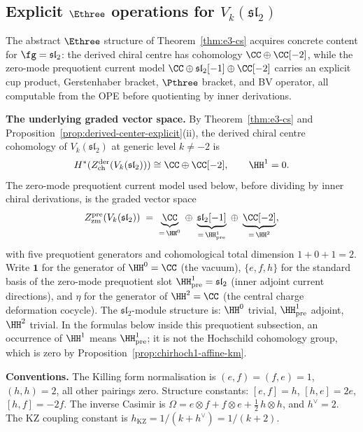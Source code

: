 \subsection{Explicit $\Ethree$ operations for
$V_k(\mathfrak{sl}_2)$}
\label{subsec:e3-explicit}

The abstract $\Ethree$ structure of
Theorem~\ref{thm:e3-cs} acquires concrete content
for $\fg = \mathfrak{sl}_2$: the derived chiral centre has cohomology
\(\CC\oplus\CC[-2]\), while the zero-mode prequotient current model
\(\CC \oplus \mathfrak{sl}_2[-1] \oplus \CC[-2]\) carries an explicit
cup product, Gerstenhaber bracket, $\Pthree$ bracket, and BV operator,
all computable from the OPE before quotienting by inner derivations.

\medskip
\noindent
\textbf{The underlying graded vector space.}
By Theorem~\ref{thm:e3-cs} and
Proposition~\ref{prop:derived-center-explicit}(ii), the derived chiral
centre cohomology of $V_k(\mathfrak{sl}_2)$ at generic level
$k \neq -2$ is
\[
H^*(Z^{\mathrm{der}}_{\mathrm{ch}}(V_k(\mathfrak{sl}_2)))
\cong \CC \oplus \CC[-2],
\qquad \HH^1=0.
\]
The zero-mode prequotient current model used below, before dividing by
inner chiral derivations, is the graded vector space
\begin{equation}\label{eq:e3-graded-space}
 Z^{\mathrm{pre}}_{\mathrm{zm}}(V_k(\mathfrak{sl}_2))
 \;=\;
 \underbrace{\CC}_{=\, \HH^0}
 \;\oplus\;
 \underbrace{\mathfrak{sl}_2[-1]}_{=\, \HH^1_{\mathrm{pre}}}
 \;\oplus\;
 \underbrace{\CC[-2]}_{=\, \HH^2},
\end{equation}
with five prequotient generators and cohomological total dimension
\(1+0+1=2\). Write $\mathbf{1}$
for the generator of $\HH^0 = \CC$ (the vacuum),
$\{e, f, h\}$ for the standard basis of the zero-mode prequotient slot
$\HH^1_{\mathrm{pre}} = \mathfrak{sl}_2$
(inner adjoint current directions), and $\eta$
for the generator of $\HH^2 = \CC$
(the central charge deformation cocycle). The
$\mathfrak{sl}_2$-module structure is: $\HH^0$ trivial,
$\HH^1_{\mathrm{pre}}$ adjoint, $\HH^2$ trivial. In the formulas below
inside this prequotient subsection, an occurrence of \(\HH^1\) means
\(\HH^1_{\mathrm{pre}}\); it is not the Hochschild cohomology group,
which is zero by Proposition~\ref{prop:chirhoch1-affine-km}.

\medskip
\noindent
\textbf{Conventions.}
The Killing form normalisation is
$(e, f) = (f, e) = 1$, $(h, h) = 2$, all other pairings zero.
Structure constants: $[e, f] = h$, $[h, e] = 2e$,
$[h, f] = -2f$. The inverse Casimir is
$\Omega = e \otimes f + f \otimes e
+ \tfrac{1}{2}\,h \otimes h$, and $h^\vee = 2$.
The KZ coupling constant is
$h_{\mathrm{KZ}} = 1/(k + h^\vee) = 1/(k + 2)$.

